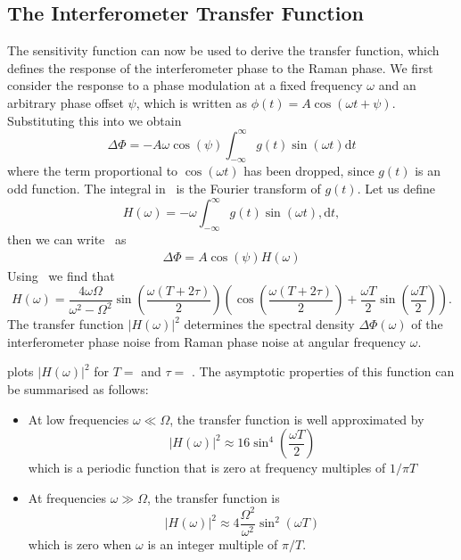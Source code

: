 \subsection{The Interferometer Transfer Function}\label{subsec:laser_phase}
The sensitivity function can now be used to derive the transfer
function, which defines the response of the interferometer phase to
the Raman phase. We first consider the response to a phase modulation at a
fixed frequency $\omega$ and an arbitrary phase offset $\psi$, which
is written as
\(\phi(t) = A\cos(\omega t + \psi)\). Substituting this into
 we obtain
\begin{equation}
  \Delta\Phi = - A \omega \cos(\psi) \int_{-\infty}^\infty g(t) \sin(\omega
  t) \mathrm{d} t
  \label{eq:phase_fourier}
\end{equation}
where the term proportional to \(\cos(\omega t)\) has been dropped,
since \(g(t)\) is an odd function. The integral
in~ is the Fourier
transform of \(g(t)\). Let us define
\begin{equation}
  H(\omega) = -\omega \int_{-\infty}^{\infty} g(t) \sin(\omega t),
  \mathrm{d} t,
  \label{eq:sensitvity_fourier}
\end{equation}
then we can write~ as
\begin{align}
  \Delta\Phi = A \cos(\psi) H(\omega)
  \label{eq:interfometer_fourier}
\end{align}
Using~
we find that~\nocite{Canuel2007}
\begin{equation}
  H(\omega) = \frac{4 \omega
  \Omega}{\omega^2-\Omega^2}\sin\left(\frac{\omega(T+2\tau)}{2}\right)\left(\cos\left(\frac{\omega(T+2\tau)}{2}\right)
  + \frac{\omega T}{2}\sin \left(\frac{\omega T}{2}\right)\right).
  \label{eq:sens_fourier_full}
\end{equation}
The transfer function $|H(\omega)|^2$ determines the
spectral density $\Delta\Phi(\omega)$ of the interferometer phase
noise from Raman phase noise at angular frequency $\omega$.
\par\noindent
{} plots $|H(\omega)|^2$ for
\(T= \)  and \(\tau
= \) . The asymptotic properties of this
function can be summarised as follows:
\begin{itemize}
  \item At low frequencies \(\omega \ll \Omega\), the transfer
    function is well approximated by 
    \begin{equation}
      |H(\omega)|^2 \approx 16 \sin^4 \left(\frac{\omega T}{2}\right)
    \end{equation}
    which is a periodic function that is zero at frequency multiples
    of \(1/\pi T\) \\
  \item At frequencies \(\omega \gg \Omega\), the transfer function is
    \begin{equation}
      |H(\omega)|^2 \approx 4 \frac{\Omega^2}{\omega^2}\sin^2
      \left(\omega T\right)
    \end{equation}
    which is zero when $\omega$ is an integer multiple of $\pi/T$.
\end{itemize}
